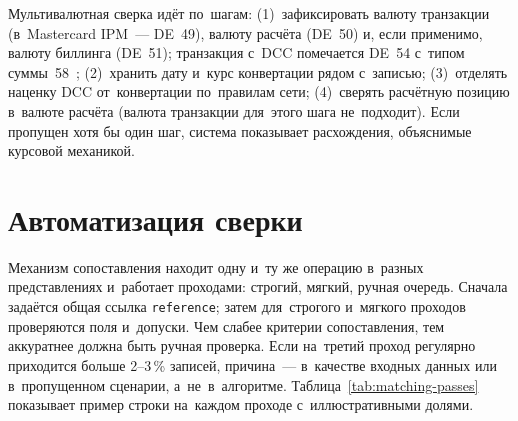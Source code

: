 Мультивалютная сверка идёт по~шагам: (1)~зафиксировать валюту
транзакции (в~Mastercard IPM~--- DE~49), валюту расчёта (DE~50) и, если
применимо, валюту биллинга (DE~51); транзакция с~DCC помечается DE~54 с~типом
суммы~58~\cite{mc-dcc-guide}; (2)~хранить дату и~курс конвертации рядом
с~записью; (3)~отделять наценку DCC от~конвертации по~правилам сети;
(4)~сверять расчётную позицию в~валюте расчёта (валюта транзакции для~этого шага
не~подходит). Если пропущен хотя бы один шаг, система показывает расхождения,
объяснимые курсовой механикой.

\section{Автоматизация сверки}\label{sec:recon-automation}

Механизм сопоставления находит одну и~ту же операцию в~разных представлениях
и~работает проходами: строгий, мягкий, ручная очередь. Сначала задаётся
общая ссылка \texttt{reference}; затем для~строгого и~мягкого проходов
проверяются поля и~допуски. Чем слабее критерии сопоставления, тем аккуратнее
должна быть ручная проверка. Если на~третий проход регулярно приходится
больше 2--3\,\% записей, причина~--- в~качестве входных данных или в~пропущенном
сценарии, а~не~в~алгоритме. Таблица~\ref{tab:matching-passes} показывает
пример строки на~каждом проходе с~иллюстративными долями.

